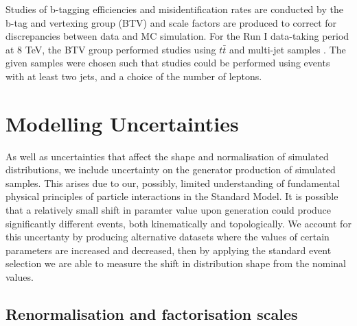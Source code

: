 
Studies of b-tagging efficiencies and misidentification rates are conducted by the b-tag and vertexing group (BTV) and scale factors are produced to correct for discrepancies between data and MC simulation. For the Run I data-taking period at 8 TeV, the BTV group performed studies using $t\bar{t}$ and multi-jet samples \cite{BTAGPAS}. The given samples were chosen such that studies could be performed using events with at least two jets, and a choice of the number of leptons. %





\section{Modelling Uncertainties} \label{sec-ModellingUncertainties}

As well as uncertainties that affect the shape and normalisation of simulated distributions, we include uncertainty on the generator production of simulated samples. This arises due to our, possibly, limited understanding of fundamental physical principles of particle interactions in the Standard Model. It is possible that a relatively small shift in paramter value upon generation could produce significantly different events, both kinematically and topologically. We account for this uncertanty by producing alternative datasets where the values of certain parameters are increased and decreased, then by applying the standard event selection we are able to measure the shift in distribution shape from the nominal values. 

\subsection{Renormalisation and factorisation scales}


